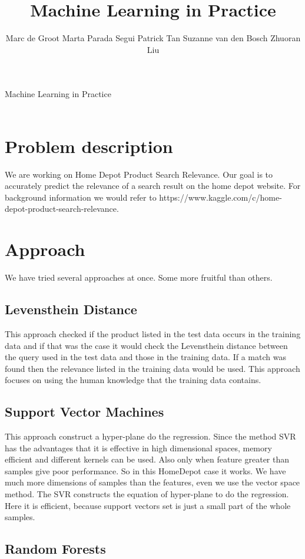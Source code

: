 \documentclass{article}
\title{Machine Learning in Practice}
\author{
Marc de Groot
Marta Parada Segui
Patrick Tan
Suzanne van den Bosch
Zhuoran Liu}
\begin{document}
{\Huge Machine Learning in Practice}
\\
\\

\section{Problem description}

We are working on Home Depot Product Search Relevance. Our goal is to accurately predict the relevance of a search result on the home depot website. For background information we would refer to https://www.kaggle.com/c/home-depot-product-search-relevance.

\section{Approach}

We have tried several approaches at once. Some more fruitful than others.

\subsection{Levensthein Distance}
This approach checked if the product listed in the test data occurs in the training data and if that was the case it would check the Levensthein distance between the query used in the test data and those in the training data. If a match was found then the relevance listed in the training data would be used. This approach focuses on using the human knowledge that the training data contains.

\subsection{Support Vector Machines}
This approach construct a  hyper-plane do the regression. Since the method SVR has the advantages that it is effective in high dimensional spaces, memory efficient and different kernels can be used. Also only when feature greater than samples give poor performance. So in this HomeDepot case it works. We have much more dimensions of samples than the features, even we use the vector space method. The SVR constructs the equation of hyper-plane to do the regression. Here it is efficient, because support vectors set is just a small part of the whole samples.

\subsection{Random Forests}
\end{document}
